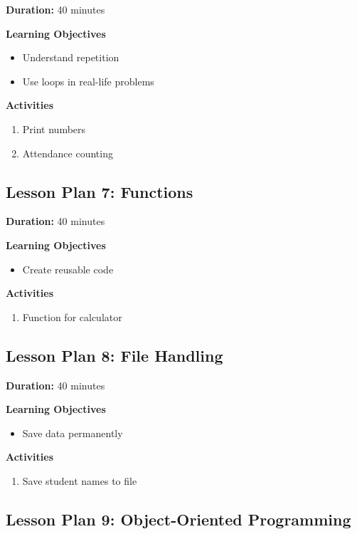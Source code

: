 \textbf{Duration:} 40 minutes

\textbf{Learning Objectives}
\begin{itemize}
    \item Understand repetition
    \item Use loops in real-life problems
\end{itemize}

\textbf{Activities}
\begin{enumerate}
    \item Print numbers
    \item Attendance counting
\end{enumerate}

\subsection*{Lesson Plan 7: Functions}

\textbf{Duration:} 40 minutes

\textbf{Learning Objectives}
\begin{itemize}
    \item Create reusable code
\end{itemize}

\textbf{Activities}
\begin{enumerate}
    \item Function for calculator
\end{enumerate}

\subsection*{Lesson Plan 8: File Handling}

\textbf{Duration:} 40 minutes

\textbf{Learning Objectives}
\begin{itemize}
    \item Save data permanently
\end{itemize}

\textbf{Activities}
\begin{enumerate}
    \item Save student names to file
\end{enumerate}

\subsection*{Lesson Plan 9: Object-Oriented Programming}

